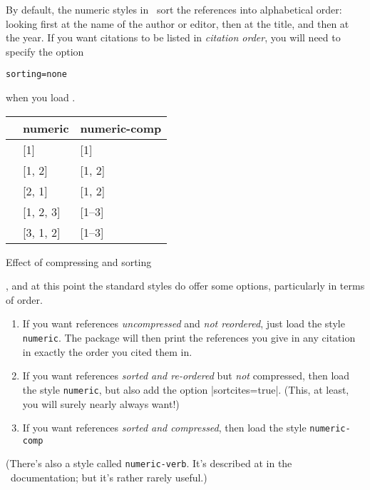 By default, the numeric styles in \biblatex\ sort the references into
alphabetical order: looking first at the name of the author or editor,
then at the title, and then at the year. If you want citations to be
listed in \emph{citation order}, you will need to specify the option
\begin{center}
\verb|sorting=none|
\end{center}
when you load \biblatex.


\begin{margintable}[4cm]
\begin{tabular}{lll}
\toprule
                       & \textsf{numeric} & \parbox{6ex}{\textsf{numeric-comp}} \\
\midrule{} & [1]              & [1]                                 \\
       & [1, 2]           & [1, 2]                              \\
       & [2, 1]           & [1, 2]                              \\
     & [1, 2, 3]        & [1--3]                              \\
     & [3, 1, 2]        & [1--3]                              \\
\bottomrule
\end{tabular}
\caption{Effect of compressing and sorting}
\end{margintable}
, and at
this point the standard styles do offer some options, particularly in
terms of order.
\begin{enumerate}
\item If you want references \emph{uncompressed} and \emph{not
    reordered}, just load the style \verb|numeric|. The package will
  then print the references you give in any citation in exactly the
  order you cited them in.
\item If you want references \emph{sorted and re-ordered} but
  \emph{not} compressed, then load the style \verb|numeric|, but also
  add the option |sortcites=true|. (This, at least, you will surely
  nearly always want!)
\item If you want references \emph{sorted and compressed}, then load
  the style \verb|numeric-comp|
\end{enumerate}
(There's also a style called
  \texttt{numeric-verb}. It's described at in the \biblatex\
  documentation; but it's rather rarely useful.)

